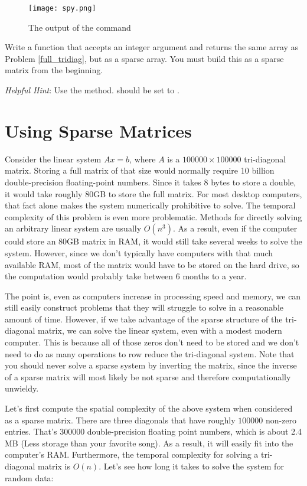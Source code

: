 \begin{figure}
\centering
\texttt{[image: spy.png]}
\caption{The output of the  command}
\label{fig:mpl_spy}
\end{figure}

\begin{problem}
Write a function that accepts an integer argument  and returns the same array as Problem \ref{full_tridiag}, but as a sparse array.
You must build this as a sparse matrix from the beginning.

\emph{Helpful Hint}: Use the  method.  should be set to .
\label{prob:sparse_tridiag}
\end{problem}

\section*{Using Sparse Matrices}
Consider the linear system $A x = b$, where $A$ is a $100000\times 100000$ tri-diagonal matrix.
Storing a full matrix of that size would normally require 10 billion double-precision floating-point numbers.  Since it takes 8 bytes to store a double, it would take roughly 80GB to store the full matrix.  For most desktop computers, that fact alone makes the system numerically prohibitive to solve.
The temporal complexity of this problem is even more problematic. Methods for directly solving an arbitrary linear system are usually $O(n^3)$. As a result, even if the computer could store an 80GB matrix in RAM, it would still take several weeks to solve the system. However, since we don't typically have computers with that much available RAM, most of the
matrix would have to be stored on the hard drive, so the computation would probably take between $6$ months to a year.

The point is, even as computers increase in processing speed and memory, we can still easily construct problems that they will struggle to solve in a reasonable amount of time. However, if we take advantage of the sparse structure of the tri-diagonal matrix, we can solve the linear system, even with a modest modern computer.  This is because all of those zeros don't need to be stored and we don't need to do as many operations to row reduce the tri-diagonal system. Note that you should never solve a sparse system by inverting the matrix, since the inverse of a sparse matrix will most likely be not sparse and therefore computationally unwieldy.

Let's first compute the spatial complexity of the above system when considered as a sparse matrix.  There are three diagonals that have roughly $100000$ non-zero entries.  That's $300000$
double-precision floating point numbers, which is about 2.4 MB (Less storage than your favorite song).  As a result, it will easily fit into the computer's RAM.  Furthermore, the temporal complexity for solving a tri-diagonal matrix is $O(n)$. Let's see how long it takes to solve the system for random data:

